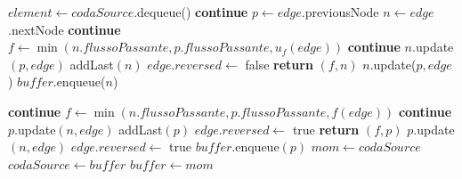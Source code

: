 \documentclass{article}
\begin{document}
\begin{algorithm}
    \begin{algorithmic}[1]
        \STATE$ element \leftarrow codaSource$.dequeue()
        \STATE \textbf{continue}
        \ENDIF
        \STATE $p \leftarrow edge$.previousNode
        \STATE $n \leftarrow edge$.nextNode
         
        \STATE \textbf{continue}
        \ELSE
        \STATE $f \leftarrow \min(n.flussoPassante,p.flussoPassante,u_f(edge))$
        \STATE \textbf{continue}
        \ENDIF
        \STATE $n.$update$(p,edge)$
        \STATE addLast$(n)$ 
        \STATE $edge.reversed \leftarrow $ false
        \STATE \textbf{return} $(f,n)$
        \ENDIF
        \ENDIF
        \STATE $n.$update($p,edge$)
        \STATE $buffer$.enqueue($n$)
    \end{algorithmic}
\end{algorithm}
\newpage
\begin{algorithm}
    \begin{algorithmic}
        \STATE\textbf{continue}
        \ELSE
        \STATE $f \leftarrow \min (n.flussoPassante,p.flussoPassante,f(edge))$
        \STATE \textbf{continue}
        \ENDIF
        \STATE $p.$update$(n,edge)$
        \STATE addLast$(p)$
        \STATE $edge.reversed \leftarrow$ true
        \STATE \textbf{return } $(f,p)$
        \ENDIF
        \ENDIF
        \STATE $p$.update$(n,edge)$
        \STATE $edge.reversed \leftarrow$ true
        \STATE $buffer.$enqueue$(p)$
        \ENDIF
        \ENDFOR
        \ENDWHILE
        \STATE $mom \leftarrow codaSource$
        \STATE $codaSource \leftarrow buffer$
        \STATE $buffer \leftarrow mom$
    \end{algorithmic}
\end{algorithm}
\newpage
\end{document}
